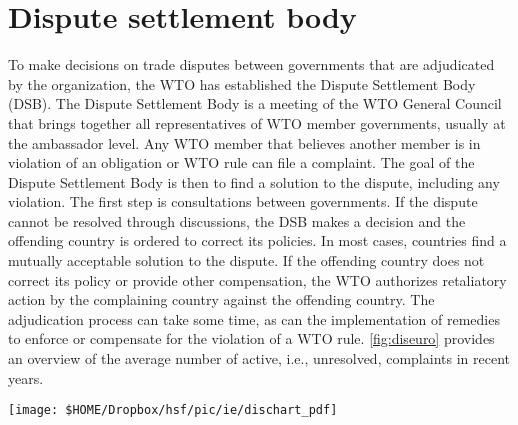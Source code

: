 \pbn
\section{Dispute settlement body}
To make decisions on trade disputes between governments that are adjudicated by the organization, the WTO has established the Dispute Settlement Body (DSB). The Dispute Settlement Body is a meeting of the WTO General Council that brings together all representatives of WTO member governments, usually at the ambassador level. Any WTO member that believes another member is in violation of an obligation or WTO rule can file a complaint. The goal of the Dispute Settlement Body is then to find a solution to the dispute, including any violation. The first step is consultations between governments. If the dispute cannot be resolved through discussions, the DSB makes a decision and the offending country is ordered to correct its policies. In most cases, countries find a mutually acceptable solution to the dispute. If the offending country does not correct its policy or provide other compensation, the WTO authorizes retaliatory action by the complaining country against the offending country. The adjudication process can take some time, as can the implementation of remedies to enforce or compensate for the violation of a WTO rule. \autoref{fig:diseuro} provides an overview of the average number of active, i.e., unresolved, complaints in recent years.


\begin{center}
	\texttt{[image: \$HOME/Dropbox/hsf/pic/ie/dischart\_pdf]}
	\label{fig:dischart}\bigskip
	
\end{center}


